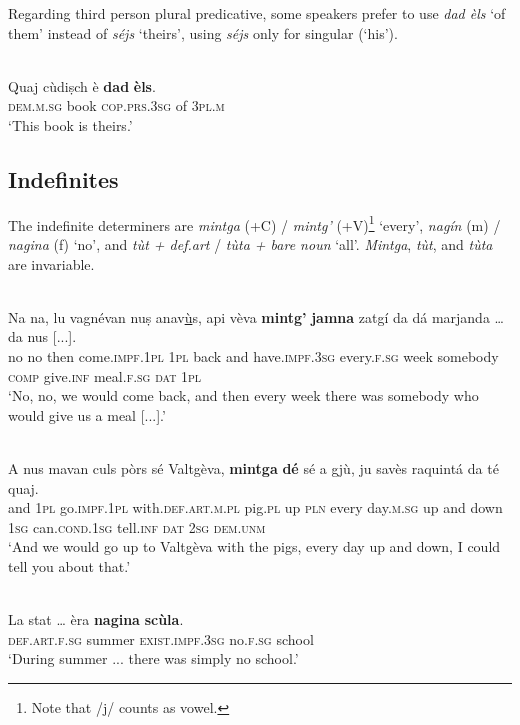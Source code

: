Regarding third person plural predicative, some speakers prefer to use \textit{dad èls} `of them' instead of \textit{séjs} `theirs', using \textit{séjs} only for singular (`his').

\ea
\label{}
\\
\gll Quaj cùdiṣch è \textbf{dad} \textbf{èls}.\\
\textsc{dem.m.sg} book \textsc{cop.prs.3sg} of \textsc{3pl.m}\\
\glt `This book is theirs.'
\z




\subsection{Indefinites}
The indefinite determiners are \textit{mintga} (+\textsc{C}) / \textit{mintg'} (+\textsc{V})\footnote{Note that /j/ counts as vowel.} `every', \textit{nagín} (m) / \textit{nagina} (f) `no', and \textit{tùt + def.art} / \textit{tùta + bare noun} `all'. \textit{Mintga}, \textit{tùt}, and \textit{tùta} are invariable.

\ea\label{}
\\
\gll Na na, lu vagnévan nuṣ anav\underline{ù}s, api vèva \textbf{mintg’} \textbf{jamna} zatgí da dá marjanda … da nus [...].\\
no no then come.\textsc{impf.1pl} \textsc{1pl} back and have.\textsc{impf.3sg} every.\textsc{f.sg}  week somebody \textsc{comp} give.\textsc{inf} meal.\textsc{f.sg} {} \textsc{dat} \textsc{1pl}\\
\glt `No, no, we would come back, and then every week there was somebody who would give us a meal [...].'
\z

\ea
\label{}
\\
\gll    A nus mavan culs pòrs sé Valtgèva, \textbf{mintga} \textbf{dé} sé a gjù, ju savès raquintá da té quaj.\\
and \textsc{1pl}  go.\textsc{impf.1pl} with.\textsc{def.art.m.pl} pig.\textsc{pl} up \textsc{pln} every day.\textsc{m.sg} up and down  \textsc{1sg}  can.\textsc{cond.1sg}  tell.\textsc{inf}  \textsc{dat}  \textsc{2sg} \textsc{dem.unm}\\
\glt `And we would go up to Valtgèva with the pigs, every day up and down, I could tell you about that.'
\z

\ea
\label{}
\\
\gll La stat … èra \textbf{nagina} \textbf{scùla}.  \\
\textsc{def.art.f.sg} summer {} \textsc{exist.impf.3sg} no.\textsc{f.sg} school \\
\glt `During summer ... there was simply no school.'
\z

